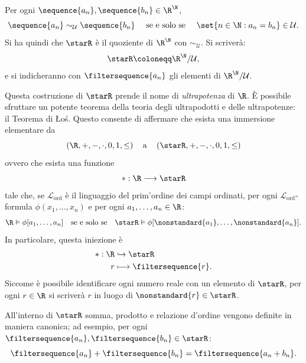 Per ogni \mbox{$ \sequence{a_{n}}, \sequence{b_{n} } \in \R^{\N} $}, \begin{equation*}
    \sequence{a_{n} }\mathrel{\sim_{\mathcal{U}} }\sequence{b_{n} }\quad\text{ se e solo se }\quad\set{ n \in \N: a_{n}=b_{n}  } \in \mathcal{U}.
\end{equation*}Si ha quindi che $ \starR $ è il quoziente di $ \R^{\N} $ con $ \sim_{\mathcal{U}}  $. Si scriverà: \begin{equation*}
    \starR \coloneqq \R^{\N}/\mathcal{U},
\end{equation*}e si indicheranno con $ \filtersequence{a_{n}} $ gli elementi di $ \R^{\N}/\mathcal{U} $. 

Questa costruzione di $ \starR $ prende il nome di \emph{ultrapotenza} di $ \R $. È possibile sfruttare un potente teorema della teoria degli ultrapodotti e delle ultrapotenze: il Teorema di Łoś. Questo consente di affermare che esista una immersione elementare da \begin{equation*}
    \left(\R,+,-,\cdot , 0,1,\le \right)\quad\text{a}\quad\left(\starR,+,-,\cdot , 0,1,\le \right)
\end{equation*}ovvero che esista una funzione \begin{equation*}
    *: \R \longrightarrow \starR
\end{equation*}tale che, se $ \mathcal{L}_{\text{ord}} $ è il linguaggio del prim'ordine dei campi ordinati, per ogni $ \mathcal{L}_{\text{ord}} $-formula $ \phi(x_1,\dots,x_{n} ) $ e per ogni $ a_1,\dots,a_{n} \in \R  $: \begin{equation*}
    \R\vDash\phi[a_1,\dots,a_{n} ]\quad\text{se e solo se}\quad \starR\vDash\phi[\nonstandard{a_1},\dots,\nonstandard{a_{n} }].
\end{equation*}In particolare, questa iniezione è \begin{align*}
* :\R  &\hookrightarrow\starR \\
r &\longmapsto \filtersequence{r}.
\end{align*}Siccome è possibile identificare ogni numero reale con un elemento di $ \starR $, per ogni $ r \in \R $ si scriverà $ r $ in luogo di $ \nonstandard{r} \in \starR $. 

All'interno di $ \starR $ somma, prodotto e relazione d'ordine vengono definite in maniera canonica; ad esempio, per ogni $ \filtersequence{a_{n}}, \filtersequence{b_{n}} \in \starR$: \begin{equation*}
    \filtersequence{a_{n}} + \filtersequence{b_{n}} = \filtersequence{a_{n} + b_{n} }.
\end{equation*}

